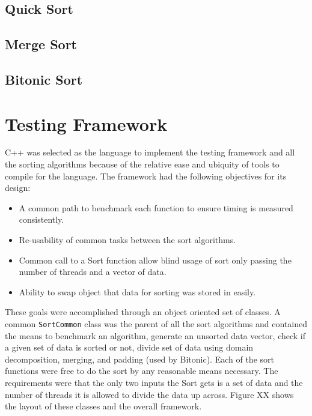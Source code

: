 \documentclass[journal]{IEEEtran}
\begin{document}
\subsection{Quick Sort}

\subsection{Merge Sort}

\subsection{Bitonic Sort}

\section{Testing Framework}
\label{sec:testing}

C++ was selected as the language to implement the testing framework and all the sorting algorithms because of the relative ease and ubiquity of tools to compile for the language. The framework had the following objectives for its design:

\begin{itemize}
\item A common path to benchmark each function to ensure timing is measured consistently.
\item Re-usability of common tasks between the sort algorithms.
\item Common call to a Sort function allow blind usage of sort only passing the number of threads and a vector of data.
\item Ability to swap object that data for sorting was stored in easily.
\end{itemize}

These goals were accomplished through an object oriented set of classes. A common \texttt{SortCommon} class was the parent of all the sort algorithms and contained the means to benchmark an algorithm, generate an unsorted data vector, check if a given set of data is sorted or not, divide set of data using domain decomposition, merging, and padding (used by Bitonic). Each of the sort functions were free to do the sort by any reasonable means necessary. The requirements were that the only two inputs the Sort gets is a set of data and the number of threads it is allowed to divide the data up across. Figure XX shows the layout of these classes and the overall framework.
\end{document}
